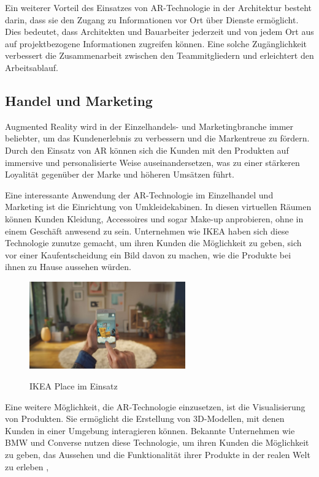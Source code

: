 Ein weiterer Vorteil des Einsatzes von AR-Technologie in der Architektur besteht darin, dass sie den Zugang zu Informationen vor Ort über Dienste ermöglicht. Dies bedeutet, dass Architekten und Bauarbeiter jederzeit und von jedem Ort aus auf projektbezogene Informationen zugreifen können. Eine solche Zugänglichkeit verbessert die Zusammenarbeit zwischen den Teammitgliedern und erleichtert den Arbeitsablauf. \cite{Chi2013ResearchTA}

\subsection{Handel und Marketing}

Augmented Reality wird in der Einzelhandels- und Marketingbranche immer beliebter, um das Kundenerlebnis zu verbessern und die Markentreue zu fördern. Durch den Einsatz von AR können sich die Kunden mit den Produkten auf immersive und personalisierte Weise auseinandersetzen, was zu einer stärkeren Loyalität gegenüber der Marke und höheren Umsätzen führt.

Eine interessante Anwendung der AR-Technologie im Einzelhandel und Marketing ist die Einrichtung von Umkleidekabinen. In diesen virtuellen Räumen können Kunden Kleidung, Accessoires und sogar Make-up anprobieren, ohne in einem Geschäft anwesend zu sein. Unternehmen wie IKEA haben sich diese Technologie zunutze gemacht, um ihren Kunden die Möglichkeit zu geben, sich vor einer Kaufentscheidung ein Bild davon zu machen, wie die Produkte bei ihnen zu Hause aussehen würden. \cite{IKEA_2017}

\vspace{1cm}

\begin{figure}[ht!]
    \centering
    \includegraphics[width=0.6\textwidth]{attachments/ikea.png}
    \caption{IKEA Place im Einsatz} \cite{IKEA_2017}
\end{figure}


Eine weitere Möglichkeit, die AR-Technologie einzusetzen, ist die Visualisierung von Produkten. Sie ermöglicht die Erstellung von 3D-Modellen, mit denen Kunden in einer Umgebung interagieren können. Bekannte Unternehmen wie BMW und Converse nutzen diese Technologie, um ihren Kunden die Möglichkeit zu geben, das Aussehen und die Funktionalität ihrer Produkte in der realen Welt zu erleben \cite{Boeriu_2022}, \cite{Online_Campaigns_2012}

